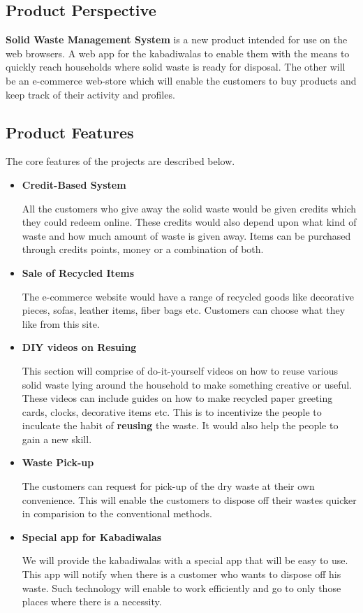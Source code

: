 \documentclass{article}
\begin{document}
\subsection{Product Perspective}
\par \textbf{Solid Waste Management System} is a new product intended for use on the web browsers. A web app for the kabadiwalas to enable them with the means to quickly reach households where solid waste is ready for disposal. The other will be an e-commerce web-store which will enable the customers to buy products and keep track of their activity and profiles.
\subsection{Product Features}
\par The core features of the projects are described below. 
\begin{itemize}
    \item \textbf{Credit-Based System}
    \par All the customers who give away the solid waste would be given credits which they could redeem online.
    These credits would also depend upon what kind of waste and how much amount of waste is given away. Items can be purchased through credits points, money or a combination of both.
    \item \textbf{Sale of Recycled Items}
    \par The e-commerce website would have a range of recycled goods like decorative pieces, sofas, leather items, fiber bags etc. Customers can choose what they like from this site.
    
    \item \textbf{DIY videos on Resuing}
    \par This section will comprise of do-it-yourself videos on how to reuse various solid waste lying around the household to make something creative or useful. These videos can include guides on how to make recycled paper greeting cards, clocks, decorative items etc. This is to incentivize the people to inculcate the habit of \textbf{reusing} the waste. It would also help the people to gain a new skill.    
    \item \textbf{Waste Pick-up}
    \par The customers can request for pick-up of the dry waste at their own convenience. This will enable the customers to dispose off their wastes quicker in comparision to the conventional methods.
    
    \item \textbf{Special app for Kabadiwalas}
    \par We will provide the kabadiwalas with a special app that will be easy to use. This app will notify when there is a customer who wants to dispose off his waste. Such technology will enable to work efficiently and go to only those places where there is a necessity.
    
    
\end{itemize}
\end{document}
